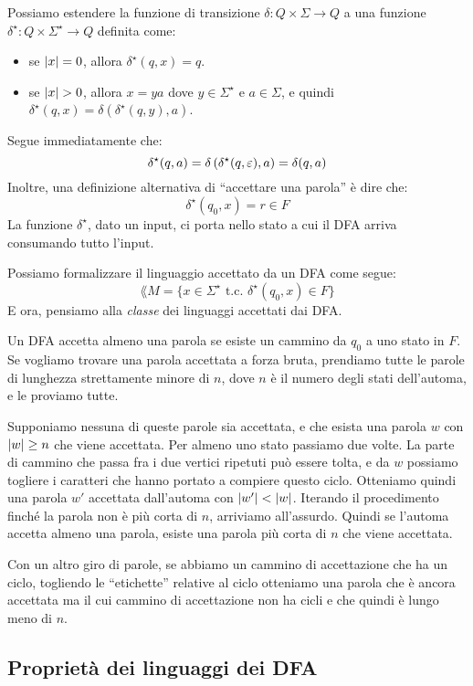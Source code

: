 Possiamo estendere la funzione di transizione $\delta : Q \times \Sigma \to Q$ a una funzione $\delta^{\star}: Q \times \Sigma^{\star} \to Q$ definita come:
\begin{itemize}
	\item se $\left\lvert{x}\right\rvert = 0$, allora $\delta^{\star}(q,x) = q$.
	\item se $\left\lvert{x}\right\rvert > 0$, allora $x = ya$ dove $y \in \Sigma^{\star}$ e $a \in \Sigma$, e quindi $\delta^{\star}(q,x) = \delta \left( \delta^{\star} (q, y), a \right)$.
\end{itemize}

Segue immediatamente che:
\[
	\delta^{\star}(q,a) = \delta \left( \delta^{\star} (q, \varepsilon) , a \right) = \delta (q,a)
\]
Inoltre, una definizione alternativa di ``accettare una parola'' \`e dire che:
\[
	\delta^{\star} (q_0, x) = r \in F
\]
La funzione $\delta^{\star}$, dato un input, ci porta nello stato a cui il DFA arriva consumando tutto l'input.

Possiamo formalizzare il linguaggio accettato da un DFA come segue:
\[
	\lang{M} = \{ x \in \Sigma^{\star} \text{ t.c. } \delta^{\star} (q_0, x) \in F \}
\]
E ora, pensiamo alla \emph{classe} dei linguaggi accettati dai DFA.

Un DFA accetta almeno una parola se esiste un cammino da $q_0$ a uno stato in $F$.
Se vogliamo trovare una parola accettata a forza bruta, prendiamo tutte le parole di lunghezza strettamente minore di $n$, dove $n$ \`e il numero degli stati dell'automa, e le proviamo tutte.

Supponiamo nessuna di queste parole sia accettata, e che esista una parola $w$ con $\left\lvert{w}\right\rvert \ge n$ che viene accettata.
Per almeno uno stato passiamo due volte.
La parte di cammino che passa fra i due vertici ripetuti pu\`o essere tolta, e da $w$ possiamo togliere i caratteri che hanno portato a compiere questo ciclo.
Otteniamo quindi una parola $w'$ accettata dall'automa con $\left\lvert{w'}\right\rvert < \left\lvert{w}\right\rvert$.
Iterando il procedimento finch\'e la parola non \`e pi\`u corta di $n$, arriviamo all'assurdo.
Quindi se l'automa accetta almeno una parola, esiste una parola pi\`u corta di $n$ che viene accettata.

Con un altro giro di parole, se abbiamo un cammino di accettazione che ha un ciclo, togliendo le ``etichette'' relative al ciclo otteniamo una parola che \`e ancora accettata ma il cui cammino di accettazione non ha cicli e che quindi \`e lungo meno di $n$.

\subsection{Propriet\`a dei linguaggi dei DFA}

